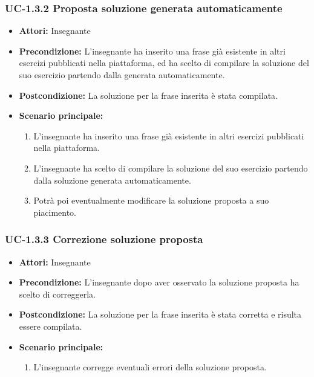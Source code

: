 \subsubsection{UC-1.3.2 Proposta soluzione generata automaticamente}
\begin{itemize}
\item \textbf{Attori: }Insegnante

\item \textbf{Precondizione: }L'insegnante ha inserito una frase già esistente in altri esercizi pubblicati nella piattaforma, ed ha scelto di compilare la soluzione del suo esercizio partendo dalla generata automaticamente.
\item \textbf{Postcondizione: }La soluzione per la frase inserita è stata compilata.

\item \textbf{Scenario principale: }
		\begin{enumerate}
		\item L'insegnante ha inserito una frase già esistente in altri esercizi pubblicati nella piattaforma.
		\item L'insegnante ha scelto di compilare la soluzione del suo esercizio partendo dalla soluzione generata automaticamente.
		\item Potrà poi eventualmente modificare la soluzione proposta a suo piacimento.
		\end{enumerate}
\end{itemize}
\subsubsection{UC-1.3.3 Correzione soluzione proposta}
\begin{itemize}
\item \textbf{Attori: }Insegnante

\item \textbf{Precondizione: }L'insegnante dopo aver osservato la soluzione proposta ha scelto di correggerla.
\item \textbf{Postcondizione: }La soluzione per la frase inserita è stata corretta e risulta essere compilata.
\item \textbf{Scenario principale: }
		\begin{enumerate}
		\item L'insegnante corregge eventuali errori della soluzione proposta. 
		\end{enumerate}
\end{itemize}
